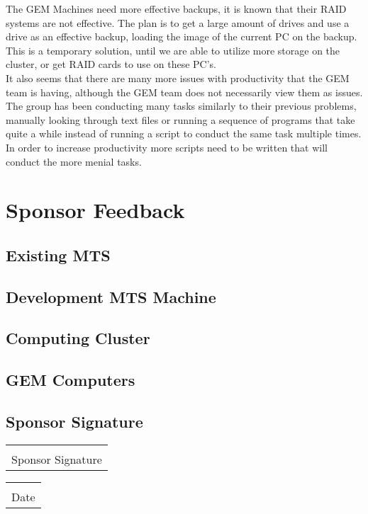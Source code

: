 \documentclass[12pt]{article}
\makeatletter
\newcommand\tab[1][1cm]{\hspace*{#1}}
\newcommand{\titledate}[2][2.5in]{%
	\noindent%
	\begin{tabular}{@{}p{#1}@{}}
		\\ \hline \\[-.75\normalbaselineskip]
		#2
	\end{tabular} \hspace{1in}
	\begin{tabular}{@{}p{#1}@{}}
		\\ \hline \\[-.75\normalbaselineskip]
		Date
	\end{tabular}
}
\makeatother
\begin{document}
\tab The GEM Machines need more effective backups, it is known that their RAID
systems are not effective. The plan is to get a large amount of drives and use
a drive as an effective backup, loading the image of the current PC on the
backup. This is a temporary solution, until we are able to utilize more
storage on the cluster, or get RAID cards to use on these PC's. \\
\tab It also seems that there are many more issues with productivity that the
 GEM team is having, although the GEM team does not necessarily view them as
 issues. The group has been conducting many tasks similarly to their previous
 problems, manually looking through text files or running a sequence of programs
 that take quite a while instead of running a script to conduct the same task
 multiple times. In order to increase productivity more scripts need to be
 written that will conduct the more menial tasks. 

\section{Sponsor Feedback}

\subsection{Existing MTS}

\vspace{1in}

\subsection{Development MTS Machine}

\vspace{1in}

\subsection{Computing Cluster}

\vspace{1in}

\subsection{GEM Computers}

\vspace{1in}

\newpage

\subsection{Sponsor Signature}
\vspace{.5in}
 \titledate{Sponsor Signature}
 
\end{document}
